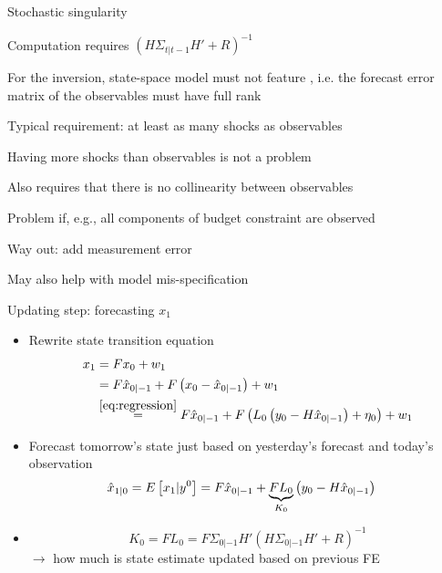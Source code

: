 \documentclass[handout,usepdftitle=false,xcolor=dvipsnames,aspectratio=169]{beamer}
\begin{document}
\begin{frame}{Stochastic singularity}
  \begin{witemize}
    \item Computation requires $\left(H\Sigma_{t|t-1}H' + R \right)^{ - 1}$
    \item For the inversion, state-space model must not feature , i.e. the forecast error matrix of the observables must have full rank
    \item Typical requirement: at least as many shocks as observables
    \item Having more shocks than observables is not a problem
    \item Also requires that there is no collinearity between observables
    \item[$\rightarrow$] Problem if, e.g., all components of budget constraint are observed
    \item Way out: add measurement error \parencite[see][]{Altug1989,Sargent1989,Ireland2004}
    \item May also help with model mis-specification \parencite{DelNegroSchorfheide2009}
  \end{witemize}
\end{frame}


\begin{frame}{Updating step: forecasting $x_1$}
  \begin{itemize}
    \item Rewrite state transition equation
          \begin{align}
            {x_{1}} & = F{x_0} + {w_{1}}\notag                                                                                                                    \\
                    & =F{{\hat x}_{0|-1}} + F\left( {{x_0} - {{\hat x}_{0|-1}}} \right) + {w_{1}} \notag                                                          \\
                    & \overset{\eqref{eq:regression}}{=} F{{\hat x}_{0|-1}} + F\left( {L_0\left( {{y_0} - H{{\hat x}_{0|-1}}} \right) + \eta_0} \right) + {w_{1}}
          \end{align}
    \item Forecast tomorrow's state just based on yesterday's forecast and today's observation
          \begin{align}
            \hat x_{1|0}=E\left[ {{x_{1}}|{y^0}} \right] & = F{{\hat x}_{0|-1}} + \underbrace {FL_0}_{K_0}\left( {{y_0} - H{{\hat x}_{0|-1}}} \right)\notag %
          \end{align}
    \item {}
          \begin{equation}
            K_0=FL_0=F{\Sigma _{0|-1}}H'{\left( {H{\Sigma _{0|-1}}H' + R} \right)^{ - 1}} \label{eq:KalmanGain}
          \end{equation}
          $\rightarrow$ how much is state estimate updated based on previous FE
  \end{itemize}
\end{frame}
\end{document}
